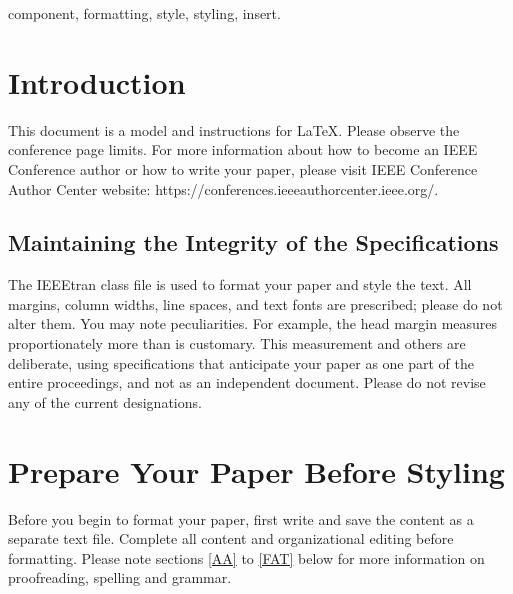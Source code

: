 \documentclass[conference]{IEEEtran}
\begin{document}
\maketitle

\begin{abstract}
This document is a model and instructions for \LaTeX.
This and the IEEEtran.cls file define the components of your paper [title, text, heads, etc.]. *CRITICAL: Do Not Use Symbols, Special Characters, Footnotes, 
or Math in Paper Title or Abstract.
\end{abstract}

\begin{IEEEkeywords}
component, formatting, style, styling, insert.
\end{IEEEkeywords}


\section{Introduction}
This document is a model and instructions for \LaTeX.
Please observe the conference page limits. For more information about how to become an IEEE Conference author or how to write your paper, please visit   IEEE Conference Author Center website: https://conferences.ieeeauthorcenter.ieee.org/.

\subsection{Maintaining the Integrity of the Specifications}

The IEEEtran class file is used to format your paper and style the text. All margins, 
column widths, line spaces, and text fonts are prescribed; please do not 
alter them. You may note peculiarities. For example, the head margin
measures proportionately more than is customary. This measurement 
and others are deliberate, using specifications that anticipate your paper 
as one part of the entire proceedings, and not as an independent document. 
Please do not revise any of the current designations.

\section{Prepare Your Paper Before Styling}
Before you begin to format your paper, first write and save the content as a 
separate text file. Complete all content and organizational editing before 
formatting. Please note sections \ref{AA} to \ref{FAT} below for more information on 
proofreading, spelling and grammar.
\end{document}
